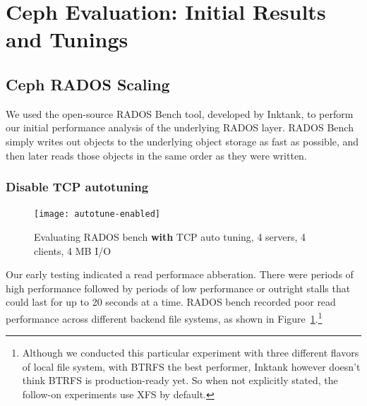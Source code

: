 \section{Ceph Evaluation: Initial Results and Tunings}
\label{sec:ceph-initial}

\subsection{Ceph RADOS Scaling}


%
%

We used the open-source RADOS Bench tool, developed by Inktank, to perform our
initial performance analysis of the underlying RADOS layer.  RADOS Bench simply
writes out objects to the underlying object storage as fast as possible, and
then later reads those objects in the same order as they were written.

\subsubsection{Disable TCP autotuning}

\begin{figure}[htb]
\centering
\texttt{[image: autotune-enabled]}
\caption{Evaluating RADOS bench \textbf{with} TCP auto tuning, 4 servers, 4
clients, 4 MB I/O}
\label{fig:rados-tcp-autotune}
\end{figure}

Our early testing indicated a read performace abberation.  There were periods
of high performance followed by periods of low performance or outright stalls
that could last for up to 20 seconds at a time.  RADOS bench recorded poor
read performance across different backend file systems, as shown in
Figure~\ref{fig:rados-tcp-autotune}.\footnote{Although we conducted this
particular experiment with three different flavors of local file system, with
BTRFS the best performer, Inktank however doesn't think BTRFS is
production-ready yet. So when not explicitly stated, the follow-on experiments
use XFS by default.}


